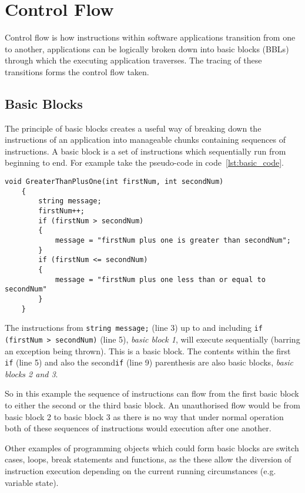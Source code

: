 \section{Control Flow}
Control flow is how instructions within software applications transition from one to another, applications can be logically broken down into basic blocks (BBLs) through which the executing application traverses. The tracing of these transitions forms the control flow taken.

\subsection{Basic Blocks}
The principle of basic blocks creates a useful way of breaking down the instructions of an application into manageable chunks containing sequences of instructions. A basic block is a set of instructions which sequentially run from beginning to end. For example take the pseudo-code in code~\ref{lst:basic_code}.

\begin{lstlisting}[language={[Sharp]C},caption={An example of code which can be broken down into basic blocks},label={lst:basic_code}]
void GreaterThanPlusOne(int firstNum, int secondNum)
    {
        string message;
        firstNum++;
        if (firstNum > secondNum)
        {
            message = "firstNum plus one is greater than secondNum";
        }
        if (firstNum <= secondNum)
        {
            message = "firstNum plus one less than or equal to secondNum"
        }
    }
\end{lstlisting}

The instructions from \verb|string message;| (line 3) up to and including \verb|if (firstNum > secondNum)| (line 5), \textit{basic block 1}, will execute sequentially (barring an exception being thrown). This is a basic block. The contents within the first \verb|if| (line 5) and also the second\verb|if| (line 9) parenthesis are also basic blocks, \textit{basic blocks 2 and 3}.

So in this example the sequence of instructions can flow from the first basic block to either the second or the third basic block. An unauthorised flow would be from basic block 2 to basic block 3 as there is no way that under normal operation both of these sequences of instructions would execution after one another.

Other examples of programming objects which could form basic blocks are switch cases, loops, break statements and functions, as the these allow the diversion of instruction execution depending on the current running circumstances (e.g. variable state).


